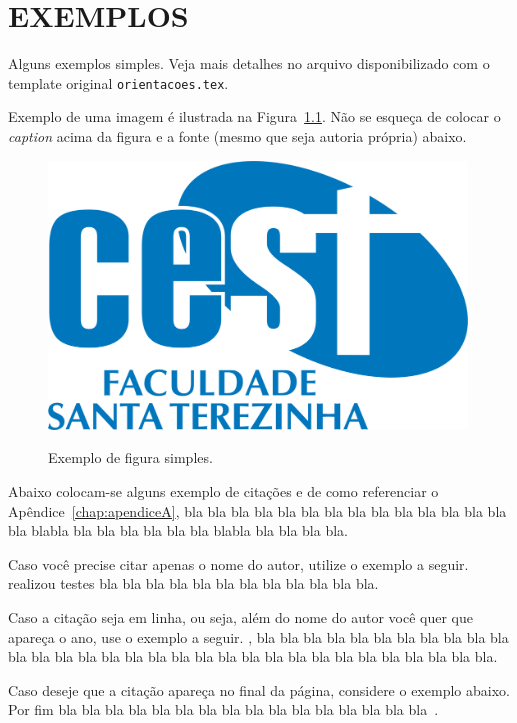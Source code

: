 
\chapter{EXEMPLOS}
\label{chap:exemplos}
Alguns exemplos simples. Veja mais detalhes no arquivo disponibilizado com o template original \texttt{orientacoes.tex}.

Exemplo de uma imagem é ilustrada na Figura~\ref{fig:exemple01}. Não se esqueça de colocar o \textit{caption} acima da figura e a fonte (mesmo que seja autoria própria) abaixo.

\begin{figure}[!htb]
    \centering
    \caption{Exemplo de figura simples.}
    
    \includegraphics[width=0.99\textwidth]{./dados/figuras/cest.png}
    \label{fig:exemple01}
\end{figure}

Abaixo colocam-se alguns exemplo de citações e de como referenciar o Apêndice~\ref{chap:apendiceA},  bla bla bla bla bla bla bla bla bla bla bla bla bla bla bla blabla bla bla bla bla bla bla blabla bla bla bla bla.


Caso você precise citar apenas o nome do autor, utilize o exemplo a seguir. \citeauthor{Cormen2009} realizou testes bla bla bla bla bla bla bla bla bla bla bla bla.


Caso a citação seja em linha, ou seja, além do nome do autor você quer que apareça o ano, use o exemplo a seguir. , bla bla bla bla bla bla bla bla bla bla bla bla bla bla bla bla bla bla bla bla bla bla bla bla bla bla bla bla bla bla bla bla.

Caso deseje que a citação apareça no final da página, considere o exemplo abaixo. Por fim bla bla bla bla bla bla bla bla bla bla bla bla bla bla bla bla~\cite{Knuth1986}.

